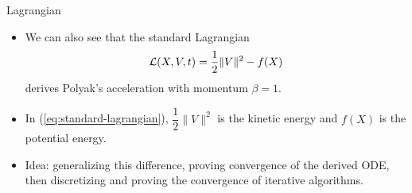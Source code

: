 \begin{frame}{Lagrangian}
  \begin{itemize}
    \item We can also see that the standard Lagrangian
          \begin{equation}
            \label{eq:standard-lagrangian}
            \mathcal{L} (X, V, t) = \dfrac{1}{2}\|V\|^2-f(X)
          \end{equation}
          derives Polyak's acceleration with momentum $\beta=1$.
    \item In (\ref{eq:standard-lagrangian}), $\dfrac{1}{2}\|V\|^2$ is the kinetic energy and $f(X)$ is the potential energy.
    \item Idea: generalizing this difference, proving convergence of the derived ODE, then discretizing and proving the convergence of iterative algorithms.
  \end{itemize}
\end{frame}